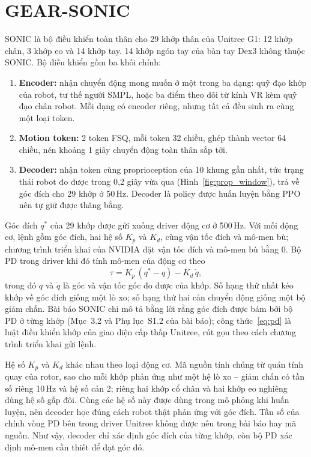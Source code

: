 \documentclass[12pt,a4paper,oneside]{report}
\begin{document}
\section{GEAR-SONIC}
\label{sec:intro_sonic}
\label{sec:sonic}

SONIC là bộ điều khiển toàn thân cho 29 khớp thân của Unitree G1: 12 khớp chân, 3 khớp eo và 14 khớp tay. 14 khớp ngón tay của bàn tay Dex3 không thuộc SONIC. Bộ điều khiển gồm ba khối chính:
\begin{enumerate}
\item \textbf{Encoder:} nhận chuyển động mong muốn ở một trong ba dạng: quỹ đạo khớp của robot, tư thế người SMPL, hoặc ba điểm theo dõi từ kính VR kèm quỹ đạo chân robot. Mỗi dạng có encoder riêng, nhưng tất cả đều sinh ra cùng một loại token.
\item \textbf{Motion token:} 2 token FSQ, mỗi token 32 chiều, ghép thành vector 64 chiều, nén khoảng 1 giây chuyển động toàn thân sắp tới.
\item \textbf{Decoder:} nhận token cùng proprioception của 10 khung gần nhất, tức trạng thái robot đo được trong 0,2 giây vừa qua (Hình~\ref{fig:prop_window}), trả về góc đích cho 29 khớp ở 50\,Hz. Decoder là policy được huấn luyện bằng PPO nên tự giữ được thăng bằng.
\end{enumerate}

Góc đích $q^*$ của 29 khớp được gửi xuống driver động cơ ở 500\,Hz. Với mỗi động cơ, lệnh gồm góc đích, hai hệ số $K_p$ và $K_d$, cùng vận tốc đích và mô-men bù; chương trình triển khai của NVIDIA đặt vận tốc đích và mô-men bù bằng 0. Bộ PD trong driver khi đó tính mô-men của động cơ theo
\begin{equation}
\tau = K_p\,(q^* - q) - K_d\,\dot{q},
\label{eq:pd}
\end{equation}
trong đó $q$ và $\dot q$ là góc và vận tốc góc đo được của khớp. Số hạng thứ nhất kéo khớp về góc đích giống một lò xo; số hạng thứ hai cản chuyển động giống một bộ giảm chấn. Bài báo SONIC chỉ mô tả bằng lời rằng góc đích được bám bởi bộ PD ở từng khớp (Mục~3.2 và Phụ lục~S1.2 của bài báo); công thức~\eqref{eq:pd} là luật điều khiển khớp của giao diện cấp thấp Unitree, rút gọn theo cách chương trình triển khai gửi lệnh.

Hệ số $K_p$ và $K_d$ khác nhau theo loại động cơ. Mã nguồn tính chúng từ quán tính quay của rotor, sao cho mỗi khớp phản ứng như một hệ lò xo -- giảm chấn có tần số riêng 10\,Hz và hệ số cản 2; riêng hai khớp cổ chân và hai khớp eo nghiêng dùng hệ số gấp đôi. Cùng các hệ số này được dùng trong mô phỏng khi huấn luyện, nên decoder học đúng cách robot thật phản ứng với góc đích. Tần số của chính vòng PD bên trong driver Unitree không được nêu trong bài báo hay mã nguồn. Như vậy, decoder chỉ xác định góc đích của từng khớp, còn bộ PD xác định mô-men cần thiết để đạt góc đó.
\end{document}
